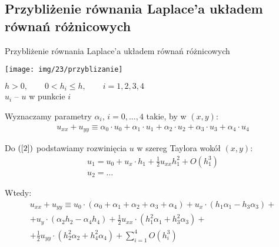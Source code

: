 \subsection{Przybliżenie równania Laplace'a układem równań różnicowych}


\begin{frame}{\large{Przybliżenie równania Laplace'a układem równań różnicowych}}
  \centerline{\texttt{[image: img/23/przyblizanie]}}
  $h>0, \qquad 0<h_i \le h, \qquad i = 1,2,3,4$ \\
  $u_i$  -- $u$ w punkcie $i$
\end{frame}

\begin{frame}
  Wyznaczamy parametry $\alpha_i$, $i=0, \dots ,4$ takie, by w $(x,y)$:
\begin{equation} \label{2}
\begin{split}
  u_{xx} + u_{yy} \equiv \alpha_0 \cdot u_0 + \alpha_1 \cdot u_1 + \alpha_2 \cdot u_2 + \alpha_3 \cdot u_3 + \alpha_4 \cdot u_4
\end{split}
\end{equation}

  Do $(\ref{2})$ podstawiamy rozwinięcia $u$ w szereg Taylora wokół $(x,y)$:
  $$ \begin{array}{l}
    u_1 = u_0 + u_x \cdot h_1 + \frac{1}{2} u_{x x} h_1^2 + O(h_1^3) \\
    u_2 = \ldots
  \end{array} $$

  Wtedy:
\begin{equation}
\begin{split}
u_{x x} + u_{y y} \equiv u_0 \cdot (\alpha_0 + \alpha_1 + \alpha_2 + \alpha_3 + \alpha_4) + u_x \cdot (h_1 \alpha_1 - h_3 \alpha_3) + \\
    + u_y \cdot (\alpha_2 h_2 - \alpha_4 h_4) + \frac{1}{2} u_{x x} \cdot (h_1^2 \alpha_1 + h_3^2 \alpha_3) + \\
    + \frac{1}{2} u_{y y} \cdot (h_2^2 \alpha_2 + h_4^2 \alpha_4) + \sum_{i=1}^4 O(h_i^3)
\end{split}
\end{equation}
\end{frame}

